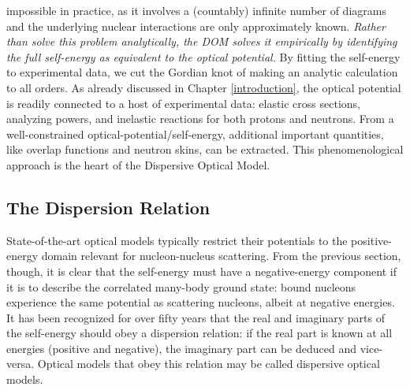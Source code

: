 impossible in practice,
as it involves a (countably) infinite number of diagrams and the underlying nuclear
interactions are only approximately known. \textit{Rather than solve this problem
analytically, the DOM solves it empirically by identifying the full self-energy as equivalent
to the optical potential.} By fitting the self-energy to experimental data, we
cut the Gordian knot of making an analytic calculation to all orders.
As already discussed in Chapter \ref{introduction}, the optical potential is  
readily connected to a host of experimental data: elastic cross sections, analyzing powers, and 
inelastic reactions for both protons and neutrons.
From a well-constrained optical-potential/self-energy, additional important quantities, like
overlap functions and neutron skins, can be extracted. This phenomenological approach is the 
heart of the Dispersive Optical Model.

\subsection{The Dispersion Relation}
State-of-the-art optical models \cite{CH89, KoningDelaroche} typically
restrict their potentials to the
positive-energy domain relevant for nucleon-nucleus scattering. From the previous
section, though, it is clear that the self-energy must have a negative-energy component
if it is to describe the
correlated many-body ground state: bound nucleons experience the same potential
as scattering nucleons, albeit at negative energies.
It has been recognized for over fifty years \cite{Feshbach1958a,
Passatore1967} that the real and imaginary
parts of the self-energy should obey a dispersion relation:
if the real part is known at all energies (positive and
negative), the imaginary part can be deduced and vice-versa. Optical models that obey this relation
may be called dispersive optical models.

